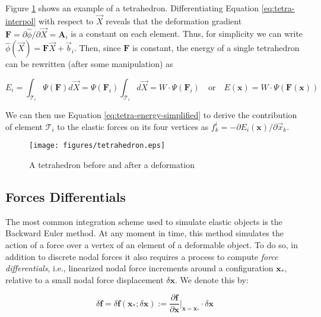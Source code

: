 \documentclass{article} %
\begin{document}
Figure \ref{fig:tetrahedron} shows an example of a tetrahedron. Differentiating Equation \ref{eq:tetra-interpol} with respect to $\overrightarrow{X}$ reveals that the deformation gradient $\mathbf{F} = \partial \hat{\phi} / \partial \overrightarrow{X} = \mathbf{A}_i$ is a constant on each element. Thus, for simplicity we can write $\hat{\phi} ( \overrightarrow{X} )= \mathbf{F}\overrightarrow{X} + \overrightarrow{b}_ i$.  Then, since $\mathbf{F}$ is constant, the energy of a single tetrahedron can be rewritten (after some manipulation) as 

\begin{equation}
E_i = \int_{\mathcal{T}_i} \Psi(\mathbf{F}) d\overrightarrow{X} = \Psi(\mathbf{F}_i)\int_{\mathcal{T}_i} d\overrightarrow{X} = W \cdot \Psi(\mathbf{F}_i)\quad \text{or}\quad  E(\mathbf{x}) = W \cdot \Psi(\mathbf{F}(\mathbf{x}))
\label{eq:tetra-energy-simplified}
\end{equation}

We can then use Equation \ref{eq:tetra-energy-simplified} to derive the contribution of element $\mathcal{T}_i$ to the elastic forces on its four vertices  as $f^i_k = - \partial E_i(\mathbf{x}) / \partial \overrightarrow{x}_k$.

\begin{figure}
\centering
\texttt{[image: figures/tetrahedron.eps]}\label{fig:tetrahedron}\caption{A tetrahedron before and after a deformation}
\end{figure}

\subsection{Forces Differentials}\label{sec:force-diff}

The most common integration scheme used to simulate elastic objects is the Backward Euler method. At any moment in time, this method simulates the action of a force over a vertex of an element of a deformable object. To do so, in addition to discrete nodal forces it also requires a process to compute \emph{force differentials}, i.e., linearized nodal force increments around a configuration $\mathbf{x}_{*}$, relative to a small nodal force displacement $\delta \mathbf{x}$. We denote this by:

\begin{equation}
\delta \mathbf{f} = \delta \mathbf{f}(\mathbf{x}_{*}; \delta\mathbf{x}) := \frac{\partial \mathbf{f}}{\partial \mathbf{x}} \Bigg |_{\mathbf{x} = \mathbf{x}_{*}} \cdot \delta \mathbf{x}
\label{eq:force-diff}
\end{equation} 
\end{document}
